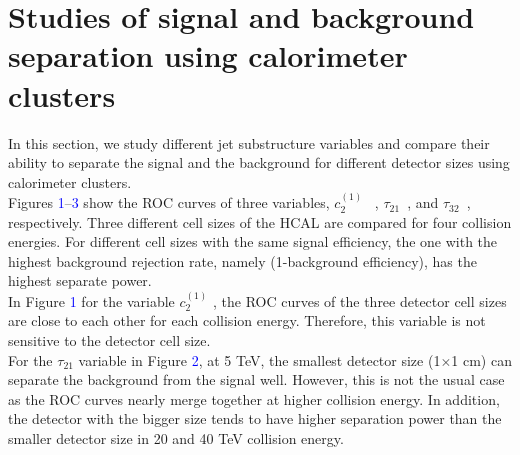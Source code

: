 \documentclass[final,1p,11pt]{elsarticle}
\begin{document}
\section{Studies of signal and background separation using calorimeter clusters}
In this section, we study different jet substructure variables and compare their ability to separate the signal and the background for different detector sizes using calorimeter clusters.\\

Figures \textcolor{blue}{1}--\textcolor{blue}{3} show the ROC curves of three variables, $c_2^{(1)}$~\cite{Larkoski:2013eya} , $\tau_{21}$~\cite{Thaler:2010tr}, and $\tau_{32}$~\cite{Thaler:2010tr}, respectively. Three different cell sizes of the HCAL are compared for four collision energies. For different cell sizes with the same signal efficiency, the one with the highest background rejection rate, namely (1-background efficiency), has the highest separate power.\\

In Figure \textcolor{blue}{1} for the variable $c_2^{(1)}$ , the ROC curves of the three detector cell sizes are close to each other for each collision energy. Therefore, this variable is not sensitive to the detector cell size.\\

For the $\tau_{21}$ variable in Figure \textcolor{blue}{2}, at 5 TeV, the smallest detector size (1$\times$1 cm) can separate the background from the signal well. However, this is not the usual case as the ROC curves nearly merge together at higher collision energy. In addition, the detector with the bigger size tends to have higher separation power than the smaller detector size in 20 and 40 TeV collision energy.\\
\end{document}
